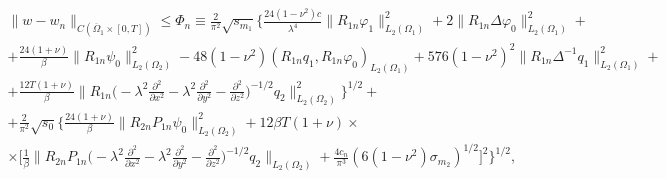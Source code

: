 \begin{multline*}


\|w-w_n\|_{C(\overline\Omega_1\times[0,T])}\le \Phi_n\equiv


\frac{2}{\pi^2}\sqrt{s_{m_1}}\biggl\{


\frac{24(1-\nu^2)c}{\lambda^4}


\|R_{1n}\varphi_1\|^2_{L_2(\Omega_1)}+


2\|R_{1n}\Delta\varphi_0\|^2_{L_2(\Omega_1)}+ \\


%


+\frac{24(1+\nu)}{\beta}\|R_{1n}\psi_0\|^2_{L_2(\Omega_2)}-


48(1-\nu^2)(R_{1n}q_1,R_{1n}\varphi_0)_{L_2(\Omega_1)}+


576(1-\nu^2)^2\|R_{1n}\Delta^{-1}q_1\|^2_{L_2(\Omega_1)} + \\


%


+\frac{12T(1+\nu)}{\beta}\biggl\|R_{1n}\biggl(-\lambda^2


\frac{\partial^2}{\partial x^2}-\lambda^2


\frac{\partial^2}{\partial y^2}-\frac{\partial^2}{\partial z^2}


\biggr)^{-1/2}q_2\biggr\|^2_{L_2(\Omega_2)}\biggr\}^{1/2}+ \\


%


+\frac{2}{\pi^2}\sqrt{s_0}\biggl\{\frac{24(1+\nu)}{\beta}


\|R_{2n}P_{1n}\psi_0\|^2_{L_2(\Omega_2)}+


12\beta T(1+\nu)\times \\


%


\times \biggl[\frac{1}{\beta}\biggl\|R_{2n}P_{1n}


\biggl(-\lambda^2\frac{\partial^2}{\partial x^2}-\lambda^2


\frac{\partial^2}{\partial y^2}-\frac{\partial^2}{\partial z^2}


\biggr)^{-1/2}q_2\biggr\|_{L_2(\Omega_2)}+


\frac{4c_n}{\pi^3}(6(1-\nu^2)\sigma_{m_2})^{1/2}


\biggr]^2\biggr\}^{1/2},


\end{multline*}


